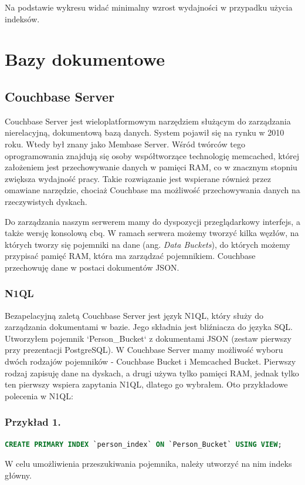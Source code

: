 \documentclass[a4paper,12pt,table]{article}
\begin{document}
{Na podstawie wykresu widać minimalny wzrost wydajności w przypadku użycia indeksów.
\newpage
\section{Bazy dokumentowe}
\setlength{\parskip}{1\bigskipamount plus \smallskipamount minus \smallskipamount}
\subsection{Couchbase Server}
Couchbase Server jest wieloplatformowym narzędziem służącym do zarządzania nierelacyjną, dokumentową bazą danych. System pojawił się na rynku w 2010 roku. Wtedy był znany jako Membase Server.\cite{cdb} Wśród twórców tego oprogramowania znajdują się osoby współtworzące technologię memcached, której założeniem jest przechowywanie danych w pamięci RAM, co w znacznym stopniu zwiększa wydajność pracy. Takie rozwiązanie jest wspierane również przez omawiane narzędzie, chociaż Couchbase ma możliwość przechowywania danych na rzeczywistych dyskach.

Do zarządzania naszym serwerem mamy do dyspozycji przeglądarkowy interfejs, a także wersję konsolową cbq. W ramach serwera możemy tworzyć kilka węzłów, na których tworzy się pojemniki na dane (ang.\textit{ Data Buckets}), do których możemy przypisać pamięć RAM, która ma zarządzać pojemnikiem. Couchbase przechowuję dane w postaci dokumentów JSON.
\subsubsection{N1QL}
Bezapelacyjną zaletą Couchbase Server jest język N1QL, który służy do zarządzania dokumentami w bazie. Jego składnia jest bliźniacza do języka SQL. 
Utworzyłem pojemnik `Person\_Bucket` z dokumentami JSON (zestaw pierwszy przy prezentacji PostgreSQL). W Couchbase Server mamy możliwość wyboru dwóch rodzajów pojemników - Couchbase Bucket i Memcached Bucket. Pierwszy rodzaj zapisuję dane na dyskach, a drugi używa tylko pamięci RAM, jednak tylko ten pierwszy wspiera zapytania N1QL, dlatego go wybrałem. Oto przykładowe polecenia w N1QL:
\subsubsection*{Przykład 1.}
\begin{lstlisting}[language=SQL,basicstyle=\footnotesize]
CREATE PRIMARY INDEX `person_index` ON `Person_Bucket` USING VIEW;
\end{lstlisting}
\vspace{0.5cm}
W celu umożliwienia przeszukiwania pojemnika, należy utworzyć na nim indeks główny.
}
\end{document}
